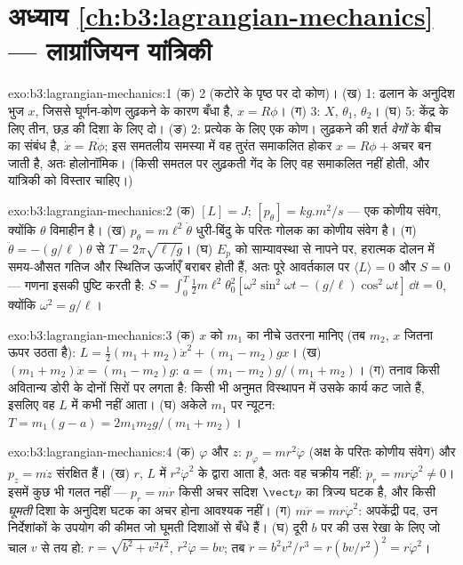 \section*{अध्याय \ref{ch:b3:lagrangian-mechanics} --- लाग्रांजियन यांत्रिकी}

\begin{solution}{exo:b3:lagrangian-mechanics:1}
(क) 2 (कटोरे के पृष्ठ पर दो कोण)। (ख) 1: ढलान के अनुदिश भुज $x$, जिससे
घूर्णन-कोण लुढ़कने के कारण बँधा है, $x =
R\phi$। (ग) 3: $X$, $\theta_1$, $\theta_2$। (घ) 5: केंद्र के लिए तीन,
छड़ की दिशा के लिए दो। (ङ) 2: प्रत्येक के लिए एक कोण। लुढ़कने की शर्त
\emph{वेगों} के बीच का संबंध है, $\dot x =
R\dot\phi$; इस समतलीय समस्या में वह तुरंत समाकलित होकर $x = R\phi +
\text{अचर}$ बन जाती है, अतः होलोनॉमिक। (किसी समतल पर लुढ़कती गेंद के
लिए वह समाकलित नहीं होती, और  यांत्रिकी को विस्तार चाहिए।)
\end{solution}

\begin{solution}{exo:b3:lagrangian-mechanics:2}
(क) $[L] = \unit{J}$; $[p_\theta] = \unit{kg.m^2/s}$ --- एक कोणीय
संवेग, क्योंकि $\theta$ विमाहीन है। (ख) $p_\theta =
m\ell^2\dot\theta$ धुरी-बिंदु के परितः गोलक का कोणीय संवेग है।
(ग) $\ddot\theta = -(g/\ell)\theta$ से $T = 2\pi\sqrt{\ell/g}$। (घ)
$E_p$ को साम्यावस्था से नापने पर, हरात्मक दोलन में समय-औसत गतिज और
स्थितिज ऊर्जाएँ बराबर होती हैं, अतः पूरे आवर्तकाल पर $\langle
L\rangle = 0$ और $S = 0$ --- गणना इसकी पुष्टि करती है:
$S = \int_0^T\tfrac12 m\ell^2\theta_0^2[\omega^2\sin^2
\omega t - (g/\ell)\cos^2\omega t]\,\dd t = 0$, क्योंकि $\omega^2 =
g/\ell$।
\end{solution}

\begin{solution}{exo:b3:lagrangian-mechanics:3}
(क) $x$ को $m_1$ का नीचे उतरना मानिए (तब $m_2$, $x$ जितना ऊपर उठता है): $L =
\tfrac12(m_1 + m_2)\dot x^2 + (m_1 - m_2)gx$। (ख) $(m_1 + m_2)\ddot x =
(m_1 - m_2)g$: $a = (m_1 - m_2)g/(m_1 + m_2)$। (ग) तनाव किसी अवितान्य
डोरी के दोनों सिरों पर लगता है: किसी भी अनुमत विस्थापन में उसके कार्य
कट जाते हैं, इसलिए वह $L$ में कभी नहीं आता। (घ) अकेले $m_1$ पर न्यूटन: $T =
m_1(g - a) = 2m_1m_2g/(m_1 + m_2)$।
\end{solution}

\begin{solution}{exo:b3:lagrangian-mechanics:4}
(क) $\varphi$ और $z$: $p_\varphi = mr^2\dot\varphi$ (अक्ष के परितः
कोणीय संवेग) और $p_z = m\dot z$ संरक्षित हैं। (ख) $r$,
$L$ में $r^2\dot\varphi^2$ के द्वारा आता है, अतः वह चक्रीय नहीं: $\dot p_r =
mr\dot\varphi^2 \neq 0$। इसमें कुछ भी गलत नहीं --- $p_r = m\dot r$ किसी
अचर सदिश $\vect p$ का त्रिज्य घटक है, और किसी \emph{घूमती} दिशा के
अनुदिश घटक का अचर होना आवश्यक नहीं। (ग) $m\ddot r =
mr\dot\varphi^2$: अपकेंद्री पद, उन निर्देशांकों के उपयोग की कीमत जो
घूमती दिशाओं से बँधे हैं। (घ) दूरी $b$ पर की उस रेखा के लिए जो चाल $v$
से तय हो: $r = \sqrt{b^2 + v^2t^2}$, $r^2\dot\varphi = bv$;
तब $\ddot r = b^2v^2/r^3 = r(bv/r^2)^2 = r\dot\varphi^2$।
\end{solution}

